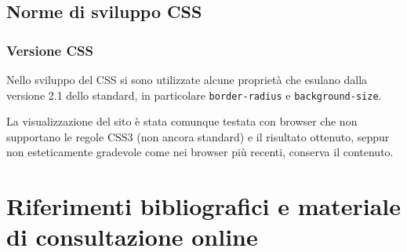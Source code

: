 \documentclass[10pt,a4paper,onecolumn]{article}
\begin{document}
\subsection{Norme di sviluppo CSS}

\subsubsection{Versione CSS}
Nello sviluppo del CSS si sono utilizzate alcune proprietà che esulano dalla versione 2.1 dello standard, in particolare \verb+border-radius+ e \verb+background-size+.

La visualizzazione del sito è stata comunque testata con browser che non supportano le regole CSS3 (non ancora standard) e il risultato ottenuto, seppur non esteticamente gradevole come nei browser più recenti, conserva il contenuto.

\clearpage

\section{Riferimenti bibliografici e materiale di consultazione online}
\end{document}
